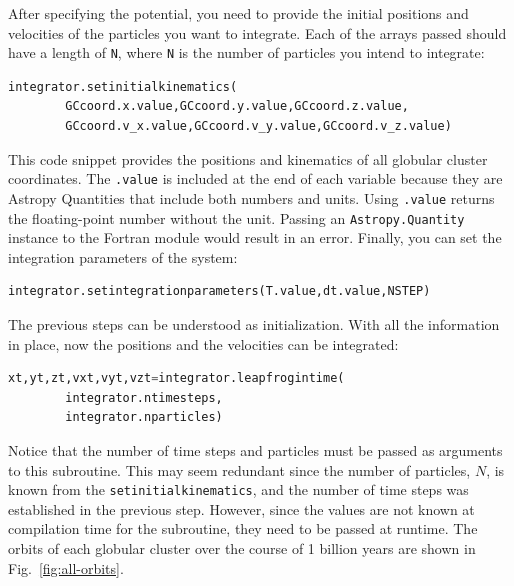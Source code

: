 After specifying the potential, you need to provide the initial positions and velocities of the particles you want to integrate. Each of the arrays passed should have a length of \texttt{N}, where \texttt{N} is the number of particles you intend to integrate:
\begin{lstlisting}[language=python]
    integrator.setinitialkinematics(
        GCcoord.x.value,GCcoord.y.value,GCcoord.z.value,
        GCcoord.v_x.value,GCcoord.v_y.value,GCcoord.v_z.value)
\end{lstlisting}  
This code snippet provides the positions and kinematics of all globular cluster coordinates. The \texttt{.value} is included at the end of each variable because they are Astropy Quantities that include both numbers and units. Using \texttt{.value} returns the floating-point number without the unit. Passing an \texttt{Astropy.Quantity} instance to the Fortran module would result in an error. Finally, you can set the integration parameters of the system:
\begin{lstlisting}[language=python]
   integrator.setintegrationparameters(T.value,dt.value,NSTEP)  
\end{lstlisting}
The previous steps can be understood as initialization. With all the information in place, now the positions and the velocities can be integrated:
\begin{lstlisting}[language=python]
    xt,yt,zt,vxt,vyt,vzt=integrator.leapfrogintime(
        integrator.ntimesteps,
        integrator.nparticles)
\end{lstlisting}
Notice that the number of time steps and particles must be passed as arguments to this subroutine. This may seem redundant since the number of particles, $N$, is known from the \texttt{setinitialkinematics}, and the number of time steps was established in the previous step. However, since the values are not known at compilation time for the subroutine, they need to be passed at runtime. The orbits of each globular cluster over the course of 1 billion years are shown in Fig.~\ref{fig:all-orbits}.
